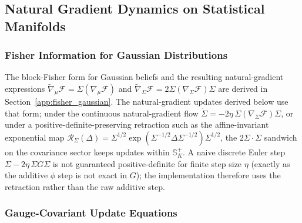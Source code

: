 \documentclass[11pt]{article}
\begin{document}
\subsection{Natural Gradient Dynamics on Statistical Manifolds}

\subsubsection{Fisher Information for Gaussian Distributions}

The block-Fisher form for Gaussian beliefs and the resulting natural-gradient expressions $\tilde{\nabla}_\mu \mathcal{F} = \Sigma (\nabla_\mu \mathcal{F})$ and $\tilde{\nabla}_\Sigma \mathcal{F} = 2\Sigma (\nabla_\Sigma \mathcal{F}) \Sigma$ are derived in Section~\ref{app:fisher_gaussian}. The natural-gradient updates derived below use that form; under the continuous natural-gradient flow $\dot{\Sigma} = -2\eta\,\Sigma(\nabla_\Sigma\mathcal{F})\Sigma$, or under a positive-definite-preserving retraction such as the affine-invariant exponential map $\mathcal{R}_\Sigma(\Delta) = \Sigma^{1/2}\exp(\Sigma^{-1/2}\Delta\Sigma^{-1/2})\Sigma^{1/2}$, the $2\Sigma \cdot \Sigma$ sandwich on the covariance sector keeps updates within $\mathbb{S}^+_K$. A naive discrete Euler step $\Sigma - 2\eta\,\Sigma G\Sigma$ is not guaranteed positive-definite for finite step size $\eta$ (exactly as the additive $\phi$ step is not exact in $G$); the implementation therefore uses the retraction rather than the raw additive step.

\subsubsection{Gauge-Covariant Update Equations}
\end{document}
